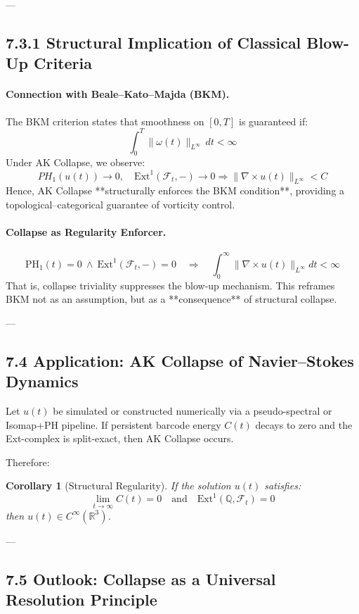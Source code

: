 \documentclass[11pt]{article}
\newtheorem{corollary}[theorem]{Corollary}
\theoremstyle{definition}
\begin{document}
---

\subsection*{7.3.1 Structural Implication of Classical Blow-Up Criteria}

\paragraph{Connection with Beale–Kato–Majda (BKM).}
The BKM criterion states that smoothness on $[0,T]$ is guaranteed if:
\[
\int_0^T \|\omega(t)\|_{L^\infty} \, dt < \infty
\]
Under AK Collapse, we observe:
\[
PH_1(u(t)) \to 0, \quad \mathrm{Ext}^1(\mathcal{F}_t, -) \to 0 \Rightarrow \|\nabla \times u(t)\|_{L^\infty} < C
\]
Hence, AK Collapse **structurally enforces the BKM condition**, providing a topological–categorical guarantee of vorticity control.

\paragraph{Collapse as Regularity Enforcer.}
\[
\mathrm{PH}_1(t) = 0 \ \wedge \ \mathrm{Ext}^1(\mathcal{F}_t,-) = 0 \quad \Rightarrow \quad \int_0^\infty \|\nabla \times u(t)\|_{L^\infty} dt < \infty
\]
That is, collapse triviality suppresses the blow-up mechanism. This reframes BKM not as an assumption,  
but as a **consequence** of structural collapse.


---

\subsection*{7.4 Application: AK Collapse of Navier–Stokes Dynamics}

Let $u(t)$ be simulated or constructed numerically via a pseudo-spectral or Isomap+PH pipeline.  
If persistent barcode energy $C(t)$ decays to zero and the Ext-complex is split-exact, then AK Collapse occurs.

Therefore:

\begin{corollary}[Structural Regularity]
If the solution $u(t)$ satisfies:
\[
\lim_{t \to \infty} C(t) = 0 \quad \text{and} \quad \mathrm{Ext}^1(\mathbb{Q}, \mathcal{F}_t) = 0
\]
then $u(t) \in C^\infty(\mathbb{R}^3)$.
\end{corollary}

---

\subsection*{7.5 Outlook: Collapse as a Universal Resolution Principle}
\end{document}
